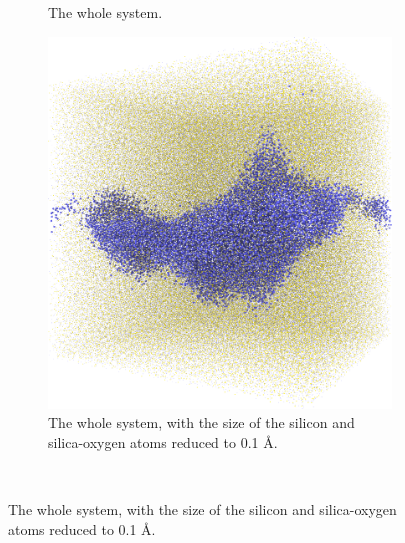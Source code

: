\begin{figure}[!p]
{\begin{subfigure}[t]{\myfigwidth}
            \caption{The whole system.}%
        \end{subfigure}%
        \hspace{\myhfillwidth}%
        \begin{subfigure}[t]{\myfigwidth}%
            \centering%
            \includegraphics[width=\textwidth]{images/systems/trimmed-rough_fracture01_abel_15}%
            \caption{The whole system, with the size of the silicon and silica-oxygen atoms reduced to 0.1 \AA.}%
        \end{subfigure}%
    }%
        \vspace{10pt}\\%
    \makebox[\textwidth][c]{%
        \begin{subfigure}[t]{\myfigwidth}%
            \centering%

\end{subfigure}}
\end{figure}
